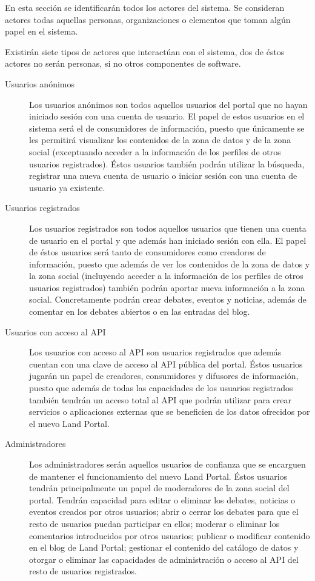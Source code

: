 En esta sección se identificarán todos los actores del sistema.  Se consideran actores todas aquellas personas, organizaciones o elementos que toman algún papel en el sistema.

Existirán siete tipos de actores que interactúan con el sistema, dos de éstos actores no serán personas, si no otros componentes de software.
\begin{description}
\item[Usuarios anónimos]  Los usuarios anónimos son todos aquellos usuarios del portal que no hayan iniciado sesión con una cuenta de usuario.  El papel de estos usuarios en el sistema será el de consumidores de información, puesto que únicamente se les permitirá visualizar los contenidos de la zona de datos y de la zona social (exceptuando acceder a la información de los perfiles de otros usuarios registrados).  Éstos usuarios también podrán utilizar la búsqueda, registrar una nueva cuenta de usuario o iniciar sesión con una cuenta de usuario ya existente.
\item[Usuarios registrados]  Los usuarios registrados son todos aquellos usuarios que tienen una cuenta de usuario en el portal y que además han iniciado sesión con ella.  El papel de éstos usuarios será tanto de consumidores como creadores de información, puesto que además de ver los contenidos de la zona de datos y la zona social (incluyendo acceder a la información de los perfiles de otros usuarios registrados) también podrán aportar nueva información a la zona social.  Concretamente podrán crear debates, eventos y noticias, además de comentar en los debates abiertos o en las entradas del blog.
\item[Usuarios con acceso al API]  Los usuarios con acceso al API son usuarios registrados que además cuentan con una clave de acceso al API pública del portal.  Éstos usuarios jugarán un papel de creadores, consumidores y difusores de información, puesto que además de todas las capacidades de los usuarios registrados también tendrán un acceso total al API que podrán utilizar para crear servicios o aplicaciones externas que se beneficien de los datos ofrecidos por el nuevo Land Portal.
\item[Administradores]  Los administradores serán aquellos usuarios de confianza que se encarguen de mantener el funcionamiento del nuevo Land Portal.  Éstos usuarios tendrán principalmente un papel de moderadores de la zona social del portal.  Tendrán capacidad para editar o eliminar los debates, noticias o eventos creados por otros usuarios; abrir o cerrar los debates para que el resto de usuarios puedan participar en ellos; moderar o eliminar los comentarios introducidos por otros usuarios; publicar o modificar contenido en el blog de Land Portal; gestionar el contenido del catálogo de datos y otorgar o eliminar las capacidades de administración o acceso al API del resto de usuarios registrados.

\end{description}
